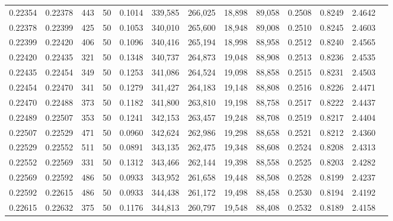 \begin{tabular}{rrrrrrrrrrrrr}
0.22354 & 0.22378 &   443 &  50 &                                     0.1014 & 339,585 & 266,025 &  18,898 &  89,058 & 0.2508 & 0.8249 & 2.4642 \\
0.22378 & 0.22399 &   425 &  50 &                                     0.1053 & 340,010 & 265,600 &  18,948 &  89,008 & 0.2510 & 0.8245 & 2.4603 \\
0.22399 & 0.22420 &   406 &  50 &                                     0.1096 & 340,416 & 265,194 &  18,998 &  88,958 & 0.2512 & 0.8240 & 2.4565 \\
0.22420 & 0.22435 &   321 &  50 &                                     0.1348 & 340,737 & 264,873 &  19,048 &  88,908 & 0.2513 & 0.8236 & 2.4535 \\
0.22435 & 0.22454 &   349 &  50 &                                     0.1253 & 341,086 & 264,524 &  19,098 &  88,858 & 0.2515 & 0.8231 & 2.4503 \\
0.22454 & 0.22470 &   341 &  50 &                                     0.1279 & 341,427 & 264,183 &  19,148 &  88,808 & 0.2516 & 0.8226 & 2.4471 \\
0.22470 & 0.22488 &   373 &  50 &                                     0.1182 & 341,800 & 263,810 &  19,198 &  88,758 & 0.2517 & 0.8222 & 2.4437 \\
0.22489 & 0.22507 &   353 &  50 &                                     0.1241 & 342,153 & 263,457 &  19,248 &  88,708 & 0.2519 & 0.8217 & 2.4404 \\
0.22507 & 0.22529 &   471 &  50 &                                     0.0960 & 342,624 & 262,986 &  19,298 &  88,658 & 0.2521 & 0.8212 & 2.4360 \\
0.22529 & 0.22552 &   511 &  50 &                                     0.0891 & 343,135 & 262,475 &  19,348 &  88,608 & 0.2524 & 0.8208 & 2.4313 \\
0.22552 & 0.22569 &   331 &  50 &                                     0.1312 & 343,466 & 262,144 &  19,398 &  88,558 & 0.2525 & 0.8203 & 2.4282 \\
0.22569 & 0.22592 &   486 &  50 &                                     0.0933 & 343,952 & 261,658 &  19,448 &  88,508 & 0.2528 & 0.8199 & 2.4237 \\
0.22592 & 0.22615 &   486 &  50 &                                     0.0933 & 344,438 & 261,172 &  19,498 &  88,458 & 0.2530 & 0.8194 & 2.4192 \\
0.22615 & 0.22632 &   375 &  50 &                                     0.1176 & 344,813 & 260,797 &  19,548 &  88,408 & 0.2532 & 0.8189 & 2.4158 \\

\end{tabular}
